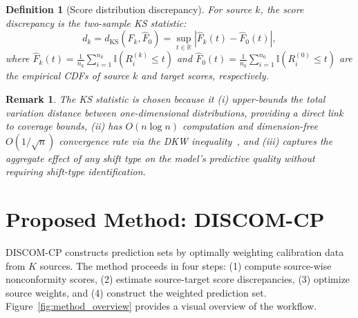 \documentclass{article}
\newtheorem{definition}{Definition}
\newtheorem{remark}{Remark}
\newcommand{\Real}{\mathbb{R}}
\newcommand{\Ind}{\mathbb{I}}
\newcommand{\dKS}{d_{\mathrm{KS}}}
\newcommand{\Fhat}{\widehat{F}}
\newcommand{\DISCOM}{\textsc{DISCOM-CP}}
\begin{document}
\begin{definition}[Score distribution discrepancy]
\label{def:discrepancy}
For source $k$, the score discrepancy is the two-sample KS statistic:
\begin{equation}
\label{eq:ks_disc}
d_k = \dKS(\Fhat_k, \Fhat_0) = \sup_{t \in \Real} \left| \Fhat_k(t) - \Fhat_0(t) \right|,
\end{equation}
where $\Fhat_k(t) = \frac{1}{n_k} \sum_{i=1}^{n_k} \Ind(R_i^{(k)} \leq t)$ and $\Fhat_0(t) = \frac{1}{n_0} \sum_{i=1}^{n_0} \Ind(R_i^{(0)} \leq t)$ are the empirical CDFs of source $k$ and target scores, respectively.
\end{definition}

\begin{remark}
The KS statistic is chosen because it (i) upper-bounds the total variation distance between one-dimensional distributions, providing a direct link to coverage bounds, (ii) has $O(n \log n)$ computation and dimension-free $O(1/\sqrt{n})$ convergence rate via the DKW inequality~\citep{dvoretzky1956asymptotic, massart1990tight}, and (iii) captures the aggregate effect of any shift type on the model's predictive quality without requiring shift-type identification.
\end{remark}

\section{Proposed Method: \DISCOM{}}
\label{sec:method}

\DISCOM{} constructs prediction sets by optimally weighting calibration data from $K$ sources. The method proceeds in four steps: (1) compute source-wise nonconformity scores, (2) estimate source-target score discrepancies, (3) optimize source weights, and (4) construct the weighted prediction set. Figure~\ref{fig:method_overview} provides a visual overview of the workflow.
\end{document}

